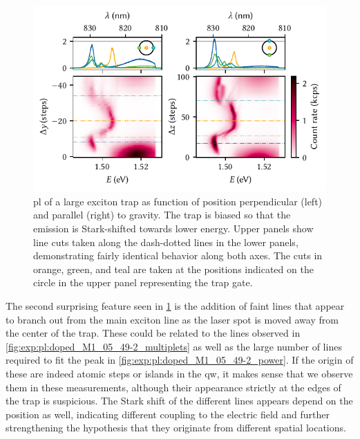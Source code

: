 \begin{figure}
    \centering
    \includegraphics{img/pdf/experiment/doped_M1_05_49-2_positioning}
    \caption[
        $V_{y}=V_{z}=\qty{30}{\volt}$.
        \protect\newline
    ]{
        \Gls{pl} of a large exciton trap as function of position perpendicular (left) and parallel (right) to gravity.
        The trap is biased so that the emission is Stark-shifted towards lower energy.
        Upper panels show line cuts taken along the dash-dotted lines in the lower panels, demonstrating fairly identical behavior along both axes.
        The cuts in orange, green, and teal are taken at the positions indicated on the circle in the upper panel representing the trap gate.
    }
    \label{fig:exp:pl:doped_M1_05_49-2_positioning}
\end{figure}

The second surprising feature seen in \cref{fig:exp:pl:doped_M1_05_49-2_positioning} is the addition of faint lines that appear to branch out from the main exciton line as the laser spot is moved away from the center of the trap.
These could be related to the lines observed in \cref{fig:exp:pl:doped_M1_05_49-2_multiplets} as well as the large number of lines required to fit the peak in \cref{fig:exp:pl:doped_M1_05_49-2_power}.
If the origin of these are indeed atomic steps or islands in the \gls{qw}, it makes sense that we observe them in these measurements, although their appearance strictly at the edges of the trap is suspicious.
The Stark shift of the different lines appears depend on the position as well, indicating different coupling to the electric field and further strengthening the hypothesis that they originate from different spatial locations.

